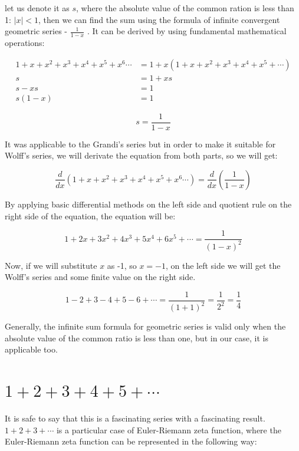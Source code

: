 \documentclass[11pt]{article}
\begin{document}
let us denote it as \(s\),
where the absolute value of the common ration is less than 1: \(|x| < 1\), then we
can find the sum using the formula of infinite convergent geometric series -
\(\frac{1}{1-x}\) . It can be derived by using fundamental mathematical
operations: 

\begin{align*}
  1+x+x^2+x^3+x^4+x^5+x^6\cdots&=1+x(1+x+x^2+x^3+x^4+x^5+\cdots)\\
  s&=1+xs\\
  s-xs&=1\\
  s(1-x)&=1
\end{align*}

\begin{equation}
  s=\frac{1}{1-x}
  \end{equation}

It was applicable to the Grandi's series but in order to make it suitable for
Wolff's series, we will derivate the equation from both parts, so we will get: 

\begin{equation*}
  \frac{d}{dx}(1+x+x^2+x^3+x^4+x^5+x^6\cdots)=\frac{d}{dx}(\frac{1}{1-x})
  \end{equation*}

By applying basic differential methods on the left side and quotient rule on the
right side of the equation, the equation will be:

\begin{equation*}
  1+2x+3x^2+4x^3+5x^4+6x^5+\cdots=\frac{1}{(1-x)^2}
  \end{equation*}

Now, if we will substitute \(x\) as -1, so \(x=-1\), on the left side we will get
the Wolff's series and some finite value on the right side.

\begin{equation}
  1-2+3-4+5-6+\cdots=\frac{1}{(1+1)^2}=\frac{1}{2^2}=\frac{1}{4}
  \label{Wolff}
\end{equation}

Generally, the infinite sum formula for geometric series is valid only when the
absolute value of the common ratio is less than one, but in our case, it is
applicable too. 

\section{\(1+2+3+4+5+\cdots\)}
\label{sec:org7a35a23}

It is safe to say that this is a fascinating series with a fascinating
result. \(1+2+3+\cdots\) is a particular case of Euler-Riemann zeta function, where
the Euler-Riemann zeta function can be represented in the following way:
\end{document}
